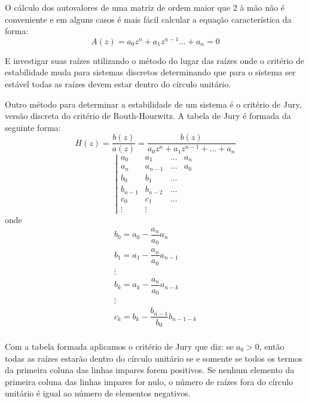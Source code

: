 O cálculo dos autovalores de uma matriz de ordem maior que 2 à mão não é conveniente e em alguns casos é mais fácil calcular a equação característica da forma:
\begin{equation}
A(z)=a_0z^n+a_1z^{n-1}\dots+a_n=0
\end{equation}

E investigar suas raízes utilizando o método do lugar das raízes onde o critério de estabilidade muda para sistemas discretos determinando que para o sistema ser estável todas as raízes devem estar dentro do círculo unitário.

Outro método para determinar a estabilidade de um sistema é o critério de Jury, versão discreta do critério de Routh-Hourwitz. A tabela de Jury é formada da seguinte forma:
\begin{equation}
H(z)=\dfrac{b(z)}{a(z)}=\dfrac{b(z)}{a_0 z^n+a_1 z^{n-1}+\dots+a_n}
\end{equation}
\begin{equation}
\left|
\begin{matrix}
a_0 & a_1& \dots & a_n\\
a_n & a_{n-1}& \dots & a_0\\
b_0 & b_1 & \dots \\
b_{n-1} & b_{n-2} & \dots \\
c_0 & c_1 & \dots \\
\vdots & \vdots
\end{matrix}
\right.
\end{equation}
onde
\begin{equation}
\begin{matrix}
b_0=a_0- \dfrac{a_n}{a_0}a_n\\
b_1=a_1- \dfrac{a_n}{a_0}a_{n-1}\\
\vdots \\
b_k=a_k- \dfrac{a_n}{a_0}a_{n-k}\\
\vdots \\
c_k=b_k- \dfrac{b_{n-1}}{b_0}b_{n-1-k}\\
\end{matrix}
\end{equation}

Com a tabela formada aplicamos o critério de Jury que diz: se $a_0>0$, então todas as raízes estarão dentro do círculo unitário se e somente se todos os termos da primeira coluna das linhas impares forem positivos. Se nenhum elemento da primeira coluna das linhas impares for nulo, o número  de raízes fora do círculo unitário é igual ao número de elementos negativos.

